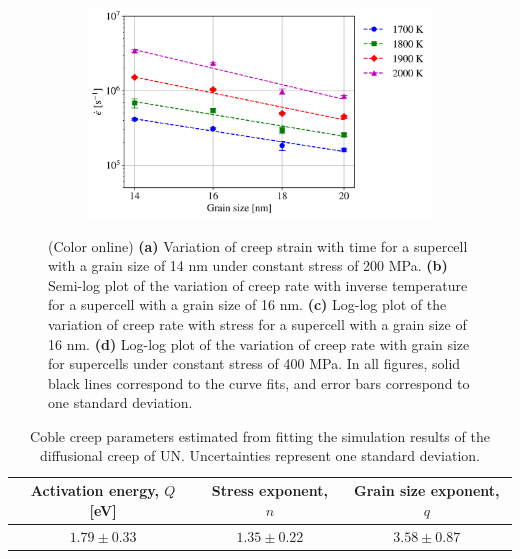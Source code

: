 \documentclass[preprint,12pt,sort&compress]{elsarticle} %
\newcommand{\?}{\stackrel{?}{=}}
\providecommand{\DIFaddtex}[1]{{\sf #1}} %
\providecommand{\DIFaddFL}[1]{\DIFadd{#1}} %
\providecommand{\DIFaddbeginFL}{} %
\providecommand{\DIFaddendFL}{} %
\providecommand{\DIFdelbeginFL}{} %
\providecommand{\DIFdelendFL}{} %
\providecommand{\DIFadd}[1]{\texorpdfstring{\DIFaddtex{#1}}{#1}} %
\newcommand{\DIFscaledelfig}{0.5}
\newlength{\DIFdelgraphicswidth} %
\newlength{\DIFdelgraphicsheight} %
\newcommand{\DIFaddincludegraphics}[2][]{{\color{blue}\fbox{\DIFOincludegraphics[#1]{#2}}}} %
\newcommand{\DIFdelincludegraphics}[2][]{%
\sbox{\DIFdelgraphicsbox}{\DIFOincludegraphics[#1]{#2}}%
\settoboxwidth{\DIFdelgraphicswidth}{\DIFdelgraphicsbox} %
\settoboxtotalheight{\DIFdelgraphicsheight}{\DIFdelgraphicsbox} %
\scalebox{\DIFscaledelfig}{%
\parbox[b]{\DIFdelgraphicswidth}{\usebox{\DIFdelgraphicsbox}\\[-\baselineskip] \rule{\DIFdelgraphicswidth}{0em}}\llap{\resizebox{\DIFdelgraphicswidth}{\DIFdelgraphicsheight}{%
\setlength{\unitlength}{\DIFdelgraphicswidth}%
\begin{picture}(1,1)%
\thicklines\linethickness{2pt} %
{\color[rgb]{1,0,0}\put(0,0){\framebox(1,1){}}}%
{\color[rgb]{1,0,0}\put(0,0){\line( 1,1){1}}}%
{\color[rgb]{1,0,0}\put(0,1){\line(1,-1){1}}}%
\end{picture}%
}\hspace*{3pt}}} %
} %
\DeclareRobustCommand{\DIFaddbeginFL}{\DIFOaddbeginFL \let\includegraphics\DIFaddincludegraphics} %
\DeclareRobustCommand{\DIFaddendFL}{\DIFOaddendFL \let\includegraphics\DIFOincludegraphics} %
\DeclareRobustCommand{\DIFdelbeginFL}{\DIFOdelbeginFL \let\includegraphics\DIFdelincludegraphics} %
\DeclareRobustCommand{\DIFdelendFL}{\DIFOaddendFL \let\includegraphics\DIFOincludegraphics} %
\begin{document}
\begin{figure}[h!]
\begin{subfigure}{0.48\textwidth}
    \caption{}
    \label{Fig:strain-rate-vs-stress-16-nm}
\end{subfigure}
\hfill
\begin{subfigure}{0.48\textwidth}
    \DIFdelbeginFL %
\DIFdelendFL \DIFaddbeginFL \includegraphics[width=\textwidth]{strain-rate-vs-grain-size-4-MPa.png}
    \DIFaddendFL \caption{}
    \label{Fig:strain-rate-vs-grain-size-400-MPa}
\end{subfigure}
\caption{(Color online) \textbf{(a)} Variation of creep strain with time for a supercell with a grain size of 14 nm under constant stress of 200 MPa. \textbf{(b)} Semi-log plot of the variation of creep rate with inverse temperature for a supercell with a grain size of 16 nm. \textbf{(c)} Log-log plot of the variation of creep rate with stress for a supercell with a grain size of 16 nm. \textbf{(d)} Log-log plot of the variation of creep rate with grain size for supercells under constant stress of 400 MPa. In all figures, solid black lines correspond to the curve fits\DIFaddbeginFL \DIFaddFL{, and error bars correspond to one standard deviation}\DIFaddendFL .}
\label{Fig:Creep}
\end{figure}

\begin{table}[h]
\centering
\caption{Coble creep parameters estimated from fitting the simulation results of the diffusional creep of UN. Uncertainties represent one standard deviation.}
\footnotesize
\begin{tabular}{ccc}
\hline
Activation energy, $Q$ [eV] & Stress exponent, $n$ & Grain size exponent, $q$ \\
\hline
$1.79 \pm 0.33$             & $1.35 \pm 0.22$      & $3.58 \pm 0.87$ \\
\hline
\end{tabular}
\label{Tab:CreepParams}
\end{table}
\end{document}
